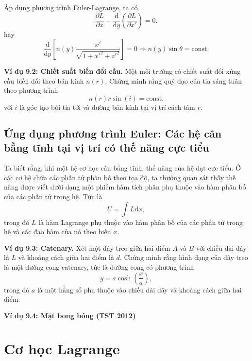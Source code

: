 Áp dụng phương trình Euler-Lagrange, ta có
\begin{equation}
    \frac{\partial L}{\partial x} - \frac{\mathrm{d}}{\mathrm{d}y} \left( \frac{\partial L}{\partial x'} \right)= 0.
\end{equation}
hay
\begin{equation}
    \dfrac{\mathrm{d}}{\mathrm{d} y} \left[ n(y) \dfrac{x'}{\sqrt{1+x'^2+z'^2}} \right]= 0 \Rightarrow n(y) \sin \theta = \text{const}.
\end{equation}

\textbf{Ví dụ 9.2: Chiết suất biến đổi cầu.} Một môi trường có chiết suất đối xứng cầu biến đổi theo bán kính \(n(r)\). Chứng minh rằng quỹ đạo của tia sáng tuân theo phương trình
\begin{equation}
    n(r) r \sin \left( i \right) = \text{const}.
\end{equation}
với \(i\) là góc tạo bởi tia tới và đường bán kính tại vị trí cách tâm \(r\).

\subsection{Ứng dụng phương trình Euler: Các hệ cân bằng tĩnh tại vị trí có thế năng cực tiểu}

Ta biết rằng, khi một hệ cơ học cân bằng tĩnh, thế năng của hệ đạt cực tiểu. Ở các cơ hệ chứa các phần tử phân bố theo tọa độ, ta thường quan sát thấy thế năng được viết dưới dạng một phiếm hàm tích phân phụ thuộc vào hàm phân bố của các phần tử trong hệ. Tức là
\begin{equation}
    U = \int L \mathrm{d}x,
\end{equation}
trong đó \(L\) là hàm Lagrange phụ thuộc vào hàm phân bố của các phần tử trong hệ và các đạo hàm của nó theo biến \(x\).

\textbf{Ví dụ 9.3: Catenary.} Xét một dây treo giữa hai điểm \(A\) và \(B\) với chiều dài dây là \(L\) và khoảng cách giữa hai điểm là \(d\). Chứng minh rằng hình dạng của dây treo là một đường cong catenary, tức là đường cong có phương trình
\begin{equation}
    y = a \cosh \left( \frac{x}{a} \right),
\end{equation}
trong đó \(a\) là một hằng số phụ thuộc vào chiều dài dây và khoảng cách giữa hai điểm.

\textbf{Ví dụ 9.4: Mặt bong bóng (TST 2012)} 

\section{Cơ học Lagrange}

